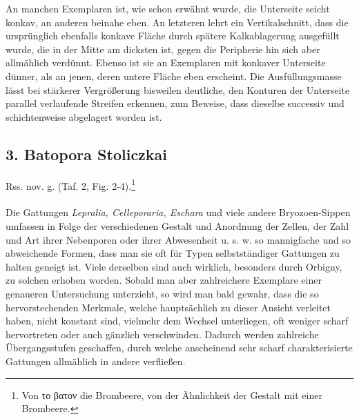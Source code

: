 \documentclass[a4paper, 11pt, oneside, german]{article}
\begin{document}
An manchen Exemplaren ist, wie schon erwähnt wurde, die Unterseite seicht konkav, an anderen beinahe eben. An letzteren lehrt ein Vertikalschnitt, dass die ursprünglich ebenfalls konkave Fläche durch spätere Kalkablagerung ausgefüllt wurde, die in der Mitte am dicksten ist, gegen die Peripherie hin sich aber allmählich verdünnt. Ebenso ist sie an Exemplaren mit konkaver Unterseite dünner, als an jenen, deren untere Fläche eben erscheint. Die Ausfüllungsmasse lässt bei stärkerer Vergrößerung bisweilen deutliche, den Konturen der Unterseite parallel verlaufende Streifen erkennen, zum Beweise, dass dieselbe successiv und schichtenweise abgelagert worden ist.
\subsection{3. Batopora Stoliczkai}
\begin{center}
Rss. nov. g. (Taf. 2, Fig. 2-4).\footnote{Von το βατον die Brombeere, von der Ähnlichkeit der Gestalt mit einer Brombeere.}
\end{center}
\paragraph{}
Die Gattungen \emph{Lepralia, Celleporaria, Eschara} und viele andere Bryozoen-Sippen umfassen in Folge der verschiedenen Gestalt und Anordnung der Zellen, der Zahl und Art ihrer Nebenporen oder ihrer Abwesenheit u. s. w. so mannigfache und so abweichende Formen, dass man sie oft für Typen selbstständiger Gattungen zu halten geneigt ist. Viele derselben sind auch wirklich, besonders durch Orbigny, zu solchen erhoben worden. Sobald man aber zahlreichere Exemplare einer genaueren Untersuchung unterzieht, so wird man bald gewahr, dass die so hervorstechenden Merkmale, welche hauptsächlich zu dieser Ansicht verleitet haben, nicht konstant sind, vielmehr dem Wechsel unterliegen, oft weniger scharf hervortreten oder auch gänzlich verschwinden. Dadurch werden zahlreiche Übergangsstufen geschaffen, durch welche anscheinend sehr scharf charakterisierte Gattungen allmählich in andere verfließen.
\end{document}
